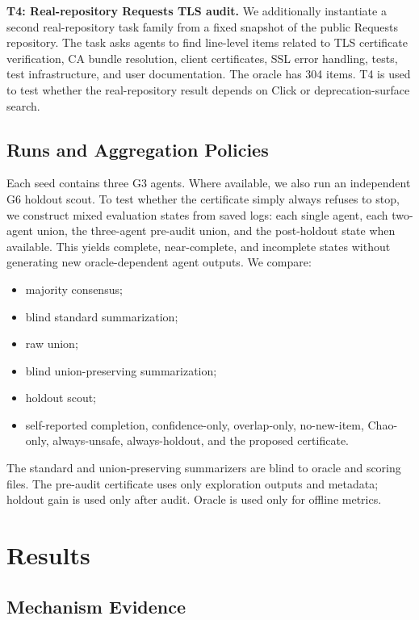 \documentclass[letterpaper]{article}
\begin{document}
\textbf{T4: Real-repository Requests TLS audit.} We additionally instantiate a
second real-repository task family from a fixed snapshot of the public Requests
repository. The task asks agents to find line-level items related to TLS
certificate verification, CA bundle resolution, client certificates, SSL error
handling, tests, test infrastructure, and user documentation. The oracle has
304 items. T4 is used to test whether the real-repository result depends on
Click or deprecation-surface search.

\subsection{Runs and Aggregation Policies}

Each seed contains three G3 agents. Where available, we also run an independent
G6 holdout scout. To test whether the certificate simply always refuses to stop,
we construct mixed evaluation states from saved logs: each single agent, each
two-agent union, the three-agent pre-audit union, and the post-holdout state
when available. This yields complete, near-complete, and incomplete states
without generating new oracle-dependent agent outputs. We compare:

\begin{itemize}
    \item majority consensus;
    \item blind standard summarization;
    \item raw union;
    \item blind union-preserving summarization;
    \item holdout scout;
    \item self-reported completion, confidence-only, overlap-only, no-new-item,
    Chao-only, always-unsafe, always-holdout, and the proposed certificate.
\end{itemize}

The standard and union-preserving summarizers are blind to oracle and scoring
files. The pre-audit certificate uses only exploration outputs and metadata;
holdout gain is used only after audit. Oracle is used only for offline metrics.

\section{Results}

\subsection{Mechanism Evidence}
\end{document}
